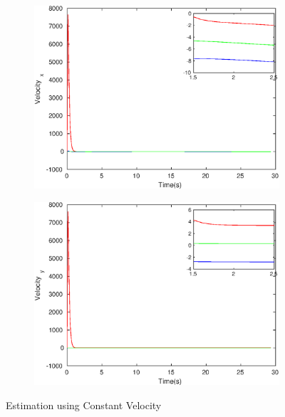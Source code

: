 \begin{figure}[h]
\begin{subfigure}{.5\linewidth}
\end{subfigure}
\begin{subfigure}{.5\linewidth}
\centering
\includegraphics[width=.9\linewidth]{figures/HInf/s3cvHInfVelocity_x}
\end{subfigure}
\begin{subfigure}{.5\linewidth}
\centering
\includegraphics[width=.9\linewidth]{figures/HInf/s3cvHInfVelocity_y}
\end{subfigure}
\caption{Estimation using Constant Velocity}
\end{figure}

